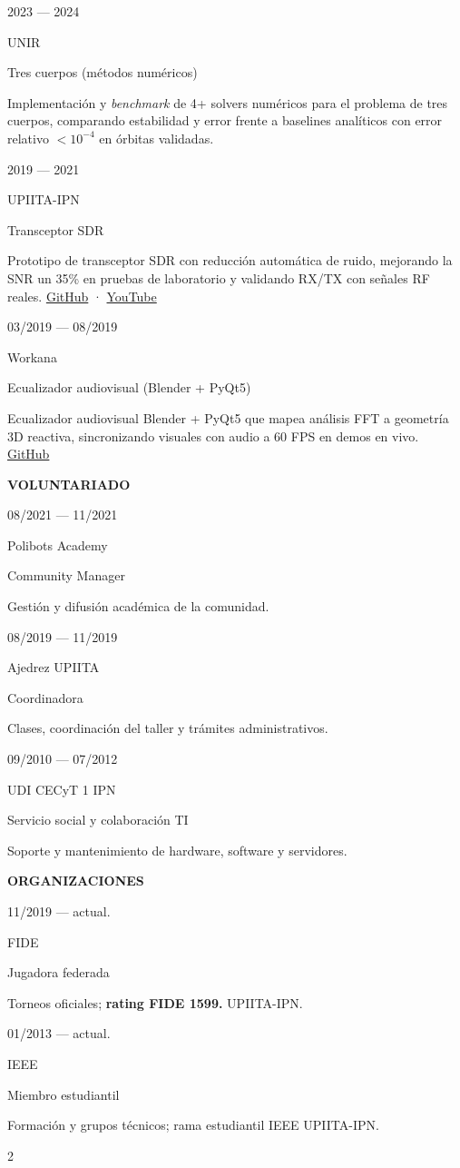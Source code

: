 \documentclass[%
               singlesided,
               paper=a4,
               fontsize=9pt
              ]{my-resume}
\makeatletter
\newlength{\cvbodygutter}
\newlength{\cvsectionrulewidth}
\newlength{\cvmaincolwd}
\renewcommand{\section}[2][]{%
    \par\addvspace{0.55em}%
    \ifstrequal{#1}{}{}{\normalsize \makebox[5mm][c]{#1}\hspace{0.5em}}
    {\color{heading}\large\bfseries\MakeUppercase{#2}}\\[-1ex]%
    \noindent{\color{heading}\rule{\cvsectionrulewidth}{0.8pt}\par}\vspace{0.2em}
}
\renewcommand{\job}[4]{%
    \needspace{4\baselineskip}%
    \setlength{\jobdateplacelength}{0.29\linewidth}%
    \setlength{\jobpositionlength}{0.71\linewidth}%
    \begin{minipage}[t]{\jobdateplacelength}%
        \raggedright
        \footnotesize
        \begin{minipage}[t]{3mm}%
            \makebox[3mm][c]{\faCalendar}
        \end{minipage}%
        \hspace{0.4em}%
        \begin{minipage}[t]{\dimexpr \jobdateplacelength-3mm-0.4em}%
            #1
        \end{minipage}%
        \par\vspace{0.05em}
        \begin{minipage}[t]{3mm}%
            \makebox[3mm][c]{\faMapMarker}
        \end{minipage}%
        \hspace{0.4em}%
        \begin{minipage}[t]{\dimexpr \jobdateplacelength-3mm-0.4em}%
            #2
        \end{minipage}%
    \end{minipage}%
    \begin{minipage}[t]{\jobpositionlength}%
        \raggedright
        {\normalsize \color{emphasis} #3}
    \end{minipage}%
    \ifstrequal{#4}{}{}{\par\vspace{0.04em}\begingroup\footnotesize\raggedright #4\endgroup}
    \par\normalsize\vspace{0.12em}
}
\renewcommand{\makebody}{%
    \setlength{\cvmaincolwd}{\dimexpr\textwidth-\highlightwidth-\cvbodygutter\relax}%
    \setlength{\columnsep}{\cvbodygutter}%
    \setcolumnwidth{\highlightwidth, \cvmaincolwd}%
    \begin{paracol}{2}
        \noindent\@highlightbar
        \switchcolumn
        \noindent\@mainbar
    \end{paracol}
}
\makeatother
\begin{document}
{    \job{2023 --- 2024}
        {UNIR}
        {Tres cuerpos (métodos numéricos)}
        {Implementación y \emph{benchmark} de 4+ solvers numéricos para el problema de tres cuerpos, comparando estabilidad y error frente a baselines analíticos con error relativo $<10^{-4}$ en órbitas validadas.}

    \job{2019 --- 2021}
        {UPIITA-IPN}
        {Transceptor SDR}
        {Prototipo de transceptor SDR con reducción automática de ruido, mejorando la SNR un 35\% en pruebas de laboratorio y validando RX/TX con señales RF reales. \href{https://github.com/sigmadg/transceiver}{GitHub} · \href{https://www.youtube.com/watch?v=uf3WM0KGN4k}{YouTube}}

    \job{03/2019 --- 08/2019}
        {Workana}
        {Ecualizador audiovisual (Blender + PyQt5)}
        {Ecualizador audiovisual Blender + PyQt5 que mapea análisis FFT a geometría 3D reactiva, sincronizando visuales con audio a 60 FPS en demos en vivo. \href{https://github.com/sigmadg/ecualizador}{GitHub}}

    \section{Voluntariado}

    \job{08/2021 --- 11/2021}
        {Polibots Academy}
        {Community Manager}
        {Gestión y difusión académica de la comunidad.}

    \job{08/2019 --- 11/2019}
        {Ajedrez UPIITA}
        {Coordinadora}
        {Clases, coordinación del taller y trámites administrativos.}

    \job{09/2010 --- 07/2012}
        {UDI CECyT 1 IPN}
        {Servicio social y colaboración TI}
        {Soporte y mantenimiento de hardware, software y servidores.}

    \section{Organizaciones}

    \job{11/2019 --- actual.}
        {FIDE}
        {Jugadora federada}
        {Torneos oficiales; \textbf{rating FIDE 1599.} UPIITA-IPN.}

    \job{01/2013 --- actual.}
        {IEEE}
        {Miembro estudiantil}
        {Formación y grupos técnicos; rama estudiantil IEEE UPIITA-IPN.}
}

\makebody
\end{document}
